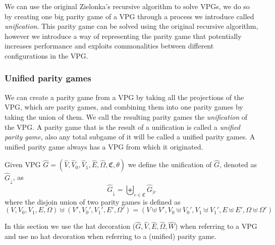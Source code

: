 We can use the original Zielonka's recursive algorithm to solve VPGs, we do so by creating one big parity game of a VPG through a process we introduce called \textit{unification}. This parity game can be solved using the original recursive algorithm, however we introduce a way of representing the parity game that potentially increases performance and exploits commonalities between different configurations in the VPG.

\subsubsection{Unified parity games}
We can create a parity game from a VPG by taking all the projections of the VPG, which are parity games, and combining them into one parity games by taking the union of them. We call the resulting parity games the \textit{unification} of the VPG. A parity game that is the result of a unification is called a \textit{unified parity game}, also any total subgame of it will be called a unified parity games. A unified parity game always has a VPG from which it originated.
\begin{definition}
	Given VPG $\hat{G} = (\hat{V},\hat{V}_0,\hat{V}_1, \hat{E},\hat{\Omega}, \mathfrak{C},\theta)$ we define the unification of $\hat{G}$, denoted as $\hat{G}_{\downarrow}$, as
	\[  \hat{G}_{\downarrow} = \biguplus_{c\in \mathfrak{C}}\hat{G}_{|c} \]
	where the disjoin union of two parity games is defined as
	\[ (V,V_0,V_1,E,\Omega) \uplus (V',V_0',V_1',E',\Omega') = (V \uplus V', V_0 \uplus V_0', V_1 \uplus V_1', E \uplus E', \Omega \uplus \Omega') \]
\end{definition}
In this section we use the hat decoration ($\hat{G},\hat{V},\hat{E},\hat{\Omega},\hat{W}$) when referring to a VPG and use no hat decoration when referring to a (unified) parity game.

